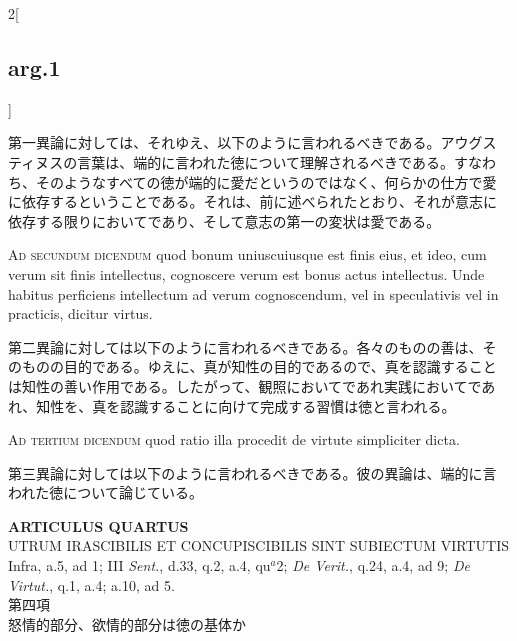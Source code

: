 \documentclass[paper=a4paper,fontsize=10pt,jafontsize=9pt,titlepage]{jlreq}
\begin{document}
\begin{paracol}{2}[\subsection{arg.1}]
\switchcolumn

第一異論に対しては、それゆえ、以下のように言われるべきである。アウグス
ティヌスの言葉は、端的に言われた徳について理解されるべきである。すなわ
ち、そのようなすべての徳が端的に愛だというのではなく、何らかの仕方で愛
に依存するということである。それは、前に述べられたとおり、それが意志に
依存する限りにおいてであり、そして意志の第一の変状は愛である。

\switchcolumn*[\subsection{ad.2}]

{\scshape Ad secundum dicendum} quod bonum uniuscuiusque est finis
eius, et ideo, cum verum sit finis intellectus, cognoscere verum est
bonus actus intellectus. Unde habitus perficiens intellectum ad verum
cognoscendum, vel in speculativis vel in practicis, dicitur virtus.

\switchcolumn

第二異論に対しては以下のように言われるべきである。各々のものの善は、そ
のものの目的である。ゆえに、真が知性の目的であるので、真を認識すること
は知性の善い作用である。したがって、観照においてであれ実践においてであ
れ、知性を、真を認識することに向けて完成する習慣は徳と言われる。

\switchcolumn*[\subsection{ad.3}]

{\scshape Ad tertium dicendum} quod ratio illa procedit de virtute
simpliciter dicta.

\switchcolumn

第三異論に対しては以下のように言われるべきである。彼の異論は、端的に言
われた徳について論じている。

\end{paracol}
\newpage
{}
{}
\setcounter{section}{4}
\setcounter{subsection}{0}


\begin{center}
{\Large {\bfseries ARTICULUS QUARTUS}}\\
{\large UTRUM IRASCIBILIS ET CONCUPISCIBILIS SINT SUBIECTUM VIRTUTIS}\\
{\footnotesize Infra, a.5, ad 1; III {\itshape Sent.}, d.33, q.2, a.4, qu$^{a}$2; {\itshape De Verit.}, q.24, a.4, ad 9; {\itshape De Virtut.}, q.1, a.4; a.10, ad 5.}\\
{\Large 第四項\\怒情的部分、欲情的部分は徳の基体か}
\end{center}
\end{document}
